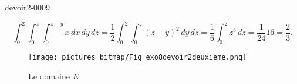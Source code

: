 \begin{corrige}{devoir2-0009}
\begin{enumerate}
\begin{equation}
  \int_0^2\int_0^z\int_0^{z-y}x\, dx\,dy\,dz=\frac{1}{2}\int_0^2\int_0^z(z-y)^2\, dy \, dz = \frac{1}{6}\int_0^2 z^3 \,dz = \frac{1}{24} 16= \frac{2}{3}.
\end{equation}
  \end{enumerate}

  \begin{figure}
    \begin{center}
      \texttt{[image: pictures\_bitmap/Fig\_exo8devoir2deuxieme.png]}
      
      \caption{Le domaine $E$}\label{exo8devoir2deuxieme}
    \end{center}
  \end{figure}
   
\end{corrige}
